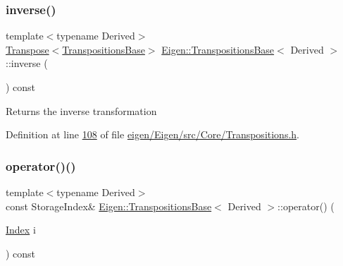 \subsubsection{\texorpdfstring{inverse()}{inverse()}\hspace{0.1cm}{\footnotesize\ttfamily [2/2]}}
{\footnotesize\ttfamily template$<$typename Derived$>$ \\
\hyperlink{group___core___module_class_eigen_1_1_transpose}{Transpose}$<$\hyperlink{class_eigen_1_1_transpositions_base}{Transpositions\+Base}$>$ \hyperlink{class_eigen_1_1_transpositions_base}{Eigen\+::\+Transpositions\+Base}$<$ Derived $>$\+::inverse (\begin{DoxyParamCaption}{ }\end{DoxyParamCaption}) const\hspace{0.3cm}{\ttfamily [inline]}}

\begin{DoxyReturn}{Returns}
the inverse transformation 
\end{DoxyReturn}


Definition at line \hyperlink{eigen_2_eigen_2src_2_core_2_transpositions_8h_source_l00108}{108} of file \hyperlink{eigen_2_eigen_2src_2_core_2_transpositions_8h_source}{eigen/\+Eigen/src/\+Core/\+Transpositions.\+h}.

\mbox{\label{class_eigen_1_1_transpositions_base_a150860addd2418f37da291f0ad9395f2}} 
\subsubsection{\texorpdfstring{operator()()}{operator()()}\hspace{0.1cm}{\footnotesize\ttfamily [1/4]}}
{\footnotesize\ttfamily template$<$typename Derived$>$ \\
const Storage\+Index\& \hyperlink{class_eigen_1_1_transpositions_base}{Eigen\+::\+Transpositions\+Base}$<$ Derived $>$\+::operator() (\begin{DoxyParamCaption}\item[{\hyperlink{class_eigen_1_1_transpositions_base_a3f5f06118b419e8e6ccbe49ed5b4c91f}{Index}}]{i }\end{DoxyParamCaption}) const\hspace{0.3cm}{\ttfamily [inline]}}

